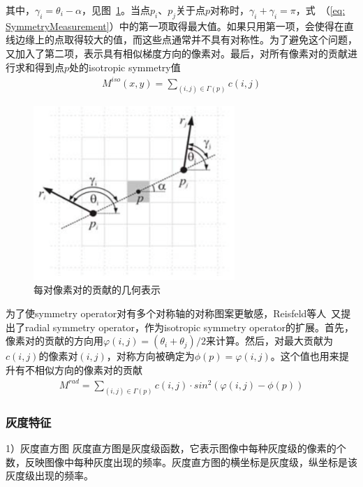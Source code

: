 \documentclass[12pt]{article}
\begin{document}
其中，$\gamma_i = \theta_i-\alpha$，见图~\ref{fig: PixelpairContribution}。当点$p_i$、$p_j$关于点$p$对称时，$\gamma_i+\gamma_i=\pi$，式~（\ref{eq: SymmetryMeasurement}）中的第一项取得最大值。如果只用第一项，会使得在直线边缘上的点取得较大的值，而这些点通常并不具有对称性。为了避免这个问题，又加入了第二项，表示具有相似梯度方向的像素对。最后，对所有像素对的贡献进行求和得到点$p$处的isotropic symmetry值
\begin{align}
M^{iso}(x, y) = \sum_{(i, j)\in \Gamma(p)} c(i, j)
\label{eq: IsotropicSymmetry}
\end{align}

\begin{figure}[!ht]
 \centering
 \includegraphics[width=3in]{PixelpairContribution}
\caption{每对像素对的贡献的几何表示}
\label{fig: PixelpairContribution}
\end{figure}

为了使symmetry operator对有多个对称轴的对称图案更敏感，Reisfeld等人~\cite{Context-Free Attentional Operators: The Generalized Symmetry Transform}又提出了radial symmetry operator，作为isotropic symmetry operator的扩展。首先，像素对的贡献的方向用$\varphi(i, j) = (\theta_i+\theta_j)/2$来计算。然后，对最大贡献为$c(i, j)$的像素对$(i, j)$，对称方向被确定为$\phi(p) = \varphi(i, j)$。这个值也用来提升有不相似方向的像素对的贡献
\begin{align}
M^{rad}= \sum_{(i, j)\in \Gamma(p)} c(i, j) \cdot sin^2(\varphi(i, j) - \phi(p))
\end{align}

\subsubsection{灰度特征}

1）灰度直方图
灰度直方图是灰度级函数，它表示图像中每种灰度级的像素的个数，反映图像中每种灰度出现的频率。灰度直方图的横坐标是灰度级，纵坐标是该灰度级出现的频率。
\end{document}
